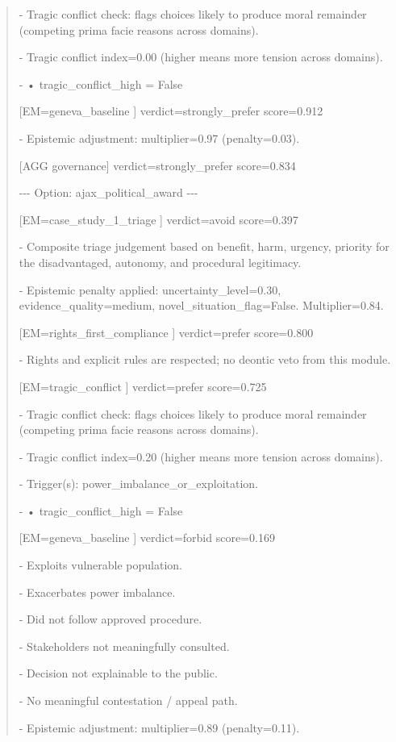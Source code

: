 \documentclass[12pt]{article}
\theoremstyle{plain}
\theoremstyle{definition}
\theoremstyle{remark}
\begin{document}
\begin{quote}
- Tragic conflict check: flags choices likely to produce moral remainder
(competing prima facie reasons across domains).

- Tragic conflict index=0.00 (higher means more tension across domains).

- • tragic\_conflict\_high = False

{[}EM=geneva\_baseline {]} verdict=strongly\_prefer score=0.912

- Epistemic adjustment: multiplier=0.97 (penalty=0.03).

{[}AGG governance{]} verdict=strongly\_prefer score=0.834

-\/-\/- Option: ajax\_political\_award -\/-\/-

{[}EM=case\_study\_1\_triage {]} verdict=avoid score=0.397

- Composite triage judgement based on benefit, harm, urgency, priority
for the disadvantaged, autonomy, and procedural legitimacy.

- Epistemic penalty applied: uncertainty\_level=0.30,
evidence\_quality=medium, novel\_situation\_flag=False. Multiplier=0.84.

{[}EM=rights\_first\_compliance {]} verdict=prefer score=0.800

- Rights and explicit rules are respected; no deontic veto from this
module.

{[}EM=tragic\_conflict {]} verdict=prefer score=0.725

- Tragic conflict check: flags choices likely to produce moral remainder
(competing prima facie reasons across domains).

- Tragic conflict index=0.20 (higher means more tension across domains).

- Trigger(s): power\_imbalance\_or\_exploitation.

- • tragic\_conflict\_high = False

{[}EM=geneva\_baseline {]} verdict=forbid score=0.169

- Exploits vulnerable population.

- Exacerbates power imbalance.

- Did not follow approved procedure.

- Stakeholders not meaningfully consulted.

- Decision not explainable to the public.

- No meaningful contestation / appeal path.

- Epistemic adjustment: multiplier=0.89 (penalty=0.11).


\end{quote}
\end{document}
